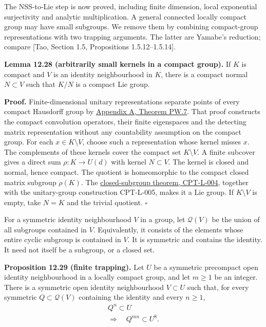 \documentclass[
  11pt,
]{article}
\begin{document}
The NSS-to-Lie step is now proved, including finite dimension, local
exponential surjectivity and analytic multiplication. A general
connected locally compact group may have small subgroups. We remove them
by combining compact-group representations with two trapping arguments.
The latter are Yamabe's reduction; compare {[}Tao, Section 1.5,
Propositions 1.5.12--1.5.14{]}.

\textbf{Lemma 12.28 (arbitrarily small kernels in a compact group).} If
\(K\) is compact and \(V\) is an identity neighbourhood in \(K\), there
is a compact normal \(N\subset V\) such that \(K/N\) is a compact Lie
group.

\textbf{Proof.} Finite-dimensional unitary representations separate
points of every compact Hausdorff group by
\hyperref[separation-and-the-exact-small-kernel-consequence]{Appendix
A, Theorem PW.7}. That proof constructs the compact convolution
operators, their finite eigenspaces and the detecting matrix
representation without any countability assumption on the compact group.
For each \(x\in K\setminus V\), choose such a representation whose
kernel misses \(x\). The complements of these kernels cover the compact
set \(K\setminus V\). A finite subcover gives a direct sum
\(\rho:K\to U(d)\) with kernel \(N\subset V\). The kernel is closed and
normal, hence compact. The quotient is homeomorphic to the compact
closed matrix subgroup \(\rho(K)\). The
\href{supporting/representations-of-compact-groups/compact-lie-foundations.html\#cpt-l-004}{closed-subgroup
theorem, CPT-L-004}, together with the unitary-group construction
CPT-L-005, makes it a Lie group. If \(K\setminus V\) is empty, take
\(N=K\) and the trivial quotient. \(\square\)

For a symmetric identity neighbourhood \(V\) in a group, let
\(\mathcal Q(V)\) be the union of all subgroups contained in \(V\).
Equivalently, it consists of the elements whose entire cyclic subgroup
is contained in \(V\). It is symmetric and contains the identity. It
need not itself be a subgroup, or a closed set.

\textbf{Proposition 12.29 (finite trapping).} Let \(U\) be a symmetric
precompact open identity neighbourhood in a locally compact group, and
let \(m\geq1\) be an integer. There is a symmetric open identity
neighbourhood \(V\subset U\) such that, for every symmetric
\(Q\subset\mathcal Q(V)\) containing the identity and every \(n\geq1\),
\[
\begin{gathered}
Q^n\subset U\\
\Longrightarrow\quad Q^{mn}\subset U^8.
\end{gathered}
\tag{12.104}
\]
\end{document}
